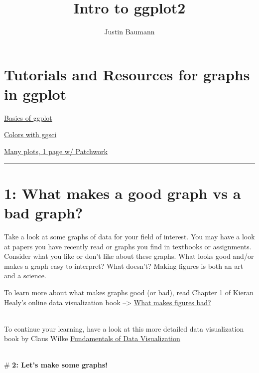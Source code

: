 \documentclass[
  letterpaper,
  DIV=11,
  numbers=noendperiod]{scrartcl}
\title{Intro to ggplot2}
\author{Justin Baumann}
\date{}
\renewcommand*\contentsname{Table of contents}
\newcommand\contentsname{Table of contents}
\begin{document}
\maketitle
\ifdefined\Shaded\renewenvironment{Shaded}{\begin{tcolorbox}[enhanced, boxrule=0pt, sharp corners, breakable, borderline west={3pt}{0pt}{shadecolor}, interior hidden, frame hidden]}{\end{tcolorbox}}\fi

\renewcommand*\contentsname{Table of contents}
{
\hypersetup{linkcolor=}
\setcounter{tocdepth}{3}
\tableofcontents
}
\hypertarget{tutorials-and-resources-for-graphs-in-ggplot}{%
\section{Tutorials and Resources for graphs in
ggplot}\label{tutorials-and-resources-for-graphs-in-ggplot}}

\href{http://www.cookbook-r.com/graphs}{Basics of ggplot}

\href{https://cran.r-project.org/web/packages/ggsci/vignettes/ggsci.html}{Colors
with ggsci}

\href{https://github.com/thomasp85/patchwork}{Many plots, 1 page w/
Patchwork}

\begin{center}\rule{0.5\linewidth}{0.5pt}\end{center}

\hypertarget{what-makes-a-good-graph-vs-a-bad-graph}{%
\section{\texorpdfstring{\textbf{1: What makes a good graph vs a bad
graph?}}{1: What makes a good graph vs a bad graph?}}\label{what-makes-a-good-graph-vs-a-bad-graph}}

Take a look at some graphs of data for your field of interest. You may
have a look at papers you have recently read or graphs you find in
textbooks or assignments. Consider what you like or don't like about
these graphs. What looks good and/or makes a graph easy to interpret?
What doesn't? Making figures is both an art and a science.

To learn more about what makes graphs good (or bad), read Chapter 1 of
Kieran Healy's online data visualization book --\textgreater{}
\href{https://socviz.co/lookatdata.html\#lookatdata}{What makes figures
bad?}\\
\strut \\
To continue your learning, have a look at this more detailed data
visualization book by Claus Wilke
\href{https://clauswilke.com/dataviz/index.html}{Fundamentals of Data
Visualization}\\
\strut \\
\# \textbf{2: Let's make some graphs!}
\end{document}
